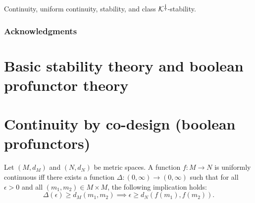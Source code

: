 \documentclass[11pt, one side, article]{memoir}
\theoremstyle{definition}
\theoremstyle{plain}
\newcommand{\cat}[1]{\mathcal{#1}}%
\newcommand{\ldag}{^{\rotatebox{180}{$\dagger$}}}
\newcommand{\K}{\cat{K}}
\newcommand{\Kdag}[1][0]{\K\ldag}
\begin{document}
Continuity, 
uniform continuity, 
stability, and
class $\Kdag$-stability.

\subsection*{Acknowledgments}



\chapter{Basic stability theory and boolean profunctor theory}
\label{chap.stability_and_profunctors}

\chapter{Continuity by co-design (boolean profunctors)}
\label{}

Let $(M,d_M)$ and $(N,d_N)$ be metric spaces. A function $f\colon M\to N$ is uniformly continuous iff there exists a function $\Delta\colon(0,\infty)\to(0,\infty)$ such that for all $\epsilon>0$ and all $(m_1,m_2)\in M\times M$, the following implication holds:
\[
\Delta(\epsilon)\geq d_M(m_1,m_2)\implies
\epsilon\geq d_N(f(m_1),f(m_2)).
\]
\end{document}
